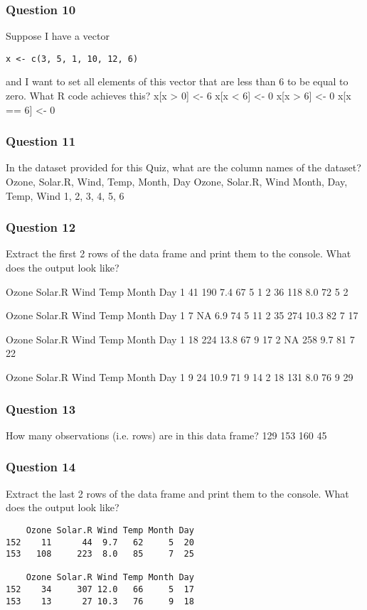 \begin{frame}
\frametitle{Question 10}
\Large
Suppose I have a vector 
\begin{verbatim}
x <- c(3, 5, 1, 10, 12, 6) 
\end{verbatim}
and I want to set all elements of this vector that are less than 6 to be equal to zero. What R code achieves this?
x[x > 0] <- 6
x[x < 6] <- 0
x[x > 6] <- 0
x[x == 6] <- 0
\end{frame}
\begin{frame}
\frametitle{Question 11}
\Large
In the dataset provided for this Quiz, what are the column names of the dataset?
Ozone, Solar.R, Wind, Temp, Month, Day
Ozone, Solar.R, Wind
Month, Day, Temp, Wind
1, 2, 3, 4, 5, 6
\end{frame}
\begin{frame}
\frametitle{Question 12}
\Large
Extract the first 2 rows of the data frame and print them to the console. What does the output look like?

  Ozone Solar.R Wind Temp Month Day
1    41     190  7.4   67     5   1
2    36     118  8.0   72     5   2
 
  Ozone Solar.R Wind Temp Month Day
1     7      NA  6.9   74     5  11
2    35     274 10.3   82     7  17
 
  Ozone Solar.R Wind Temp Month Day
1    18     224 13.8   67     9  17
2    NA     258  9.7   81     7  22
 
  Ozone Solar.R Wind Temp Month Day
1     9      24 10.9   71     9  14
2    18     131  8.0   76     9  29
\end{frame}
\begin{frame}
\frametitle{Question 13}
\Large
How many observations (i.e. rows) are in this data frame?
129
153
160
45
\end{frame}
\begin{frame}
\frametitle{Question 14}
\Large
Extract the last 2 rows of the data frame and print them to the console. What does the output look like?

\begin{verbatim}
    Ozone Solar.R Wind Temp Month Day
152    11      44  9.7   62     5  20
153   108     223  8.0   85     7  25
 
    Ozone Solar.R Wind Temp Month Day
152    34     307 12.0   66     5  17
153    13      27 10.3   76     9  18
\end{verbatim}
\end{frame}
